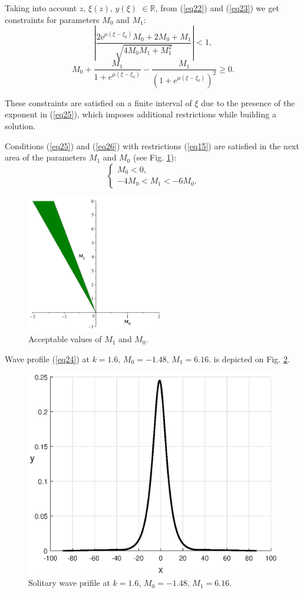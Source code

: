\documentclass[preprint,12pt]{elsarticle}
\begin{document}
Taking into account \(z\), \(\xi (z)\), \(y(\xi)\) \(\in \mathbb{R}\), from (\ref{eq22}) and (\ref{eq23}) we get constraints for parameters \(M_{0}\) and \(M_{1}\):
\begin{equation} \label{eq25}
\left|\frac{2 {\mathrm e}^{\mu (\xi-\xi_{0})} M_{0}+2 M_{0}+M_{1}}{\sqrt{4 M_{0} M_{1}+M_{1}^{2}}}\right|< 1,
\end{equation}
\begin{equation} \label{eq26}
M_{0}+\frac{M_{1}}{1+e^{\mu(\xi-\xi_{0})}}-\frac{M_{1}}{\left(1+e^{\mu(\xi-\xi_{0})}\right)^{2}}\ge 0.
\end{equation}

These constraints are satisfied on a finite interval of \(\xi\) due to the presence of the exponent in (\ref{eq25}), which imposes additional restrictions while building a solution.

Conditions (\ref{eq25}) and (\ref{eq26}) with restrictions (\ref{eq15}) are satisfied in the next area of the parameters \(M_{1}\) and \( M_{0}\) (see Fig. \ref{fig1}):
\begin{equation} \label{eq27}
\begin{cases}
M_{0}<0,\\
-4 M_{0} < M_{1} < -6 M_{0}.
\end{cases}
\end{equation}

\begin{figure}[H]  %
\center
\includegraphics[width=6cm,trim={0 0 0 0},clip]{fig1.png} 
\caption{Acceptable values of \(M_{1}\) and \( M_{0}.\)}
\label{fig1}
\end{figure}

Wave profile (\ref{eq24}) at \(k=1.6,\, M_{0}=-1.48,\, M_{1}=6.16.\) is depicted on Fig. \ref{fig8}.
\begin{figure}[H]
\center
\includegraphics[width=0.5\linewidth]{fig10.eps}
\caption{Solitary wave prifile at \(k=1.6,\, M_{0}=-1.48,\, M_{1}=6.16.\)}
\label{fig8}
\end{figure}
\end{document}
